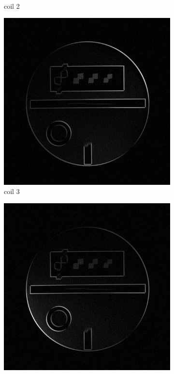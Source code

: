 \documentclass[UTF8]{article}
\begin{document}
\begin{figure}[ht]
\begin{subfigure}[h]{0.2\textwidth}
		\caption{coil 2 }
		\label{fig:2c}
	\end{subfigure}
	\begin{subfigure}[h]{0.2\textwidth}
		\centering
		\includegraphics[scale=0.15]{./image/4c.jpg}
		\caption{coil 3 }
		\label{fig:2d}
	\end{subfigure}
	\begin{subfigure}[h]{0.2\textwidth}
		\centering
		\includegraphics[scale=0.15]{./image/5c.jpg}

\end{subfigure}
\end{figure}
\end{document}
